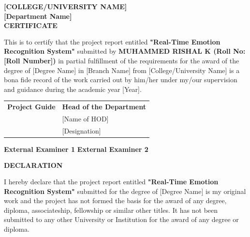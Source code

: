 \documentclass[12pt,a4paper]{report}
\begin{document}

\newpage
{}
\begin{center}
    \vspace*{1.5cm}
    \Large \textbf{[COLLEGE/UNIVERSITY NAME]} \\
    \large \textbf{[Department Name]} \\
    \vspace{2cm}
    \Huge \textbf{CERTIFICATE}
\end{center}
\vspace{1cm}
This is to certify that the project report entitled \textbf{"Real-Time Emotion Recognition System"} submitted by \textbf{MUHAMMED RISHAL K (Roll No: [Roll Number])} in partial fulfillment of the requirements for the award of the degree of [Degree Name] in [Branch Name] from [College/University Name] is a bona fide record of the work carried out by him/her under my/our supervision and guidance during the academic year [Year].

\vspace{3cm}

\noindent
\begin{tabular}{@{}p{} p{}@{}}
    \textbf{Project Guide} & \textbf{Head of the Department} \\
    [Name of Guide] & [Name of HOD] \\
    [Designation] & [Designation] \\
\end{tabular}

\vspace{3cm}
\noindent \textbf{External Examiner 1} \hfill \textbf{External Examiner 2}


\newpage
{}
\begin{center}
    \vspace*{2cm}
    \Huge \textbf{DECLARATION}
\end{center}
\vspace{1cm}
I hereby declare that the project report entitled \textbf{"Real-Time Emotion Recognition System"} submitted for the degree of [Degree Name] is my original work and the project has not formed the basis for the award of any degree, diploma, associateship, fellowship or similar other titles. It has not been submitted to any other University or Institution for the award of any degree or diploma.
\end{document}
